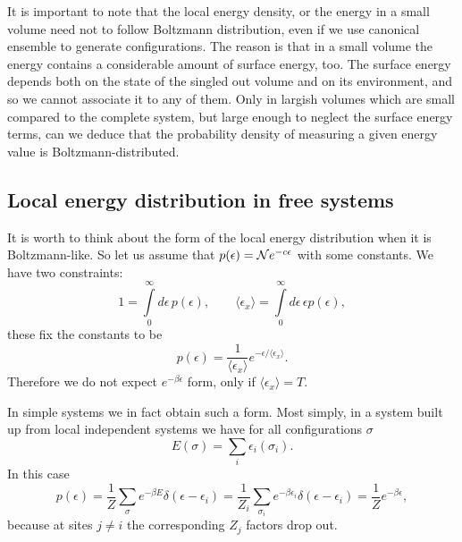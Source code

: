 \documentclass[aps,prd,twocolumn,showpacs,superscriptaddress,groupedaddress]{revtex4}  %
\newcommand{\ep}{\epsilon}
\begin{document}
It is important to note that the local energy density, or the energy
in a small volume need not to follow Boltzmann distribution, even if we
use canonical ensemble to generate configurations. The reason is that
in a small volume the energy contains a considerable amount of surface
energy, too. The surface energy depends both on the state of the
singled out volume and on its environment, and so we cannot associate it
to any of them. Only in largish volumes which are small compared to the
complete system, but large enough to neglect the surface energy terms,
can we deduce that the probability density of measuring a given energy
value is Boltzmann-distributed.

\subsection{Local energy distribution in free systems}

It is worth to think about the form of the local energy distribution
when it is Boltzmann-like. So let us assume that $p(\epsilon)={\cal N}
e^{-c\epsilon}$ with some constants. We have two constraints:
\begin{equation}
  1 = \int\limits_0^\infty d\epsilon\, p(\epsilon),\qquad
     \langle \epsilon_x \rangle = \int\limits_0^\infty
     d\epsilon\,\epsilon p(\epsilon),
\end{equation}
these fix the constants to be
\begin{equation}
  p(\epsilon) = \frac1{\langle \epsilon_x \rangle}
  e^{-\epsilon/\langle \epsilon_x \rangle}.
\end{equation}
Therefore we do not expect $e^{-\beta \ep}$ form, only if $\langle
\epsilon_x \rangle=T$.

In simple systems we in fact obtain such a form. Most simply, in a
system built up from local independent systems we have for all
configurations $\sigma$
\begin{equation}
  E(\sigma) = \sum_i \ep_i(\sigma_i).
\end{equation}
In this case 
\begin{equation}
  p(\ep)=\frac1Z \sum_{\sigma} e^{-\beta E}\delta(\ep-\ep_i) =
  \frac1{Z_i} \sum_{\sigma_i} e^{-\beta \ep_i}\delta(\ep-\ep_i) =
  \frac1Z e^{-\beta\ep},
\end{equation}
because at sites $j\neq i$ the corresponding $Z_j$ factors drop out.
\end{document}
